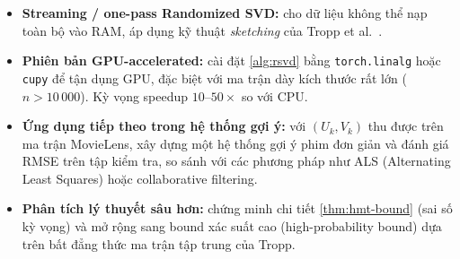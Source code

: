 \begin{itemize}
    \item \textbf{Streaming / one-pass Randomized SVD:} cho dữ liệu không thể
    nạp toàn bộ vào RAM, áp dụng kỹ thuật \emph{sketching} của
    Tropp et al.~\cite{tropp2017}.

    \item \textbf{Phiên bản GPU-accelerated:} cài đặt \cref{alg:rsvd} bằng
    \texttt{torch.linalg} hoặc \texttt{cupy} để tận dụng GPU, đặc biệt với
    ma trận dày kích thước rất lớn ($n > 10\,000$). Kỳ vọng speedup
    $10$--$50\times$ so với CPU.

    \item \textbf{Ứng dụng tiếp theo trong hệ thống gợi ý:} với
    $(U_k, V_k)$ thu được trên ma trận MovieLens, xây dựng một hệ thống gợi
    ý phim đơn giản và đánh giá RMSE trên tập kiểm tra, so sánh với các
    phương pháp như ALS (Alternating Least Squares) hoặc collaborative
    filtering.

    \item \textbf{Phân tích lý thuyết sâu hơn:} chứng minh chi tiết
    \cref{thm:hmt-bound} (sai số kỳ vọng) và mở rộng sang bound xác suất cao
    (high-probability bound) dựa trên bất đẳng thức ma trận tập trung của
    Tropp.
\end{itemize}

